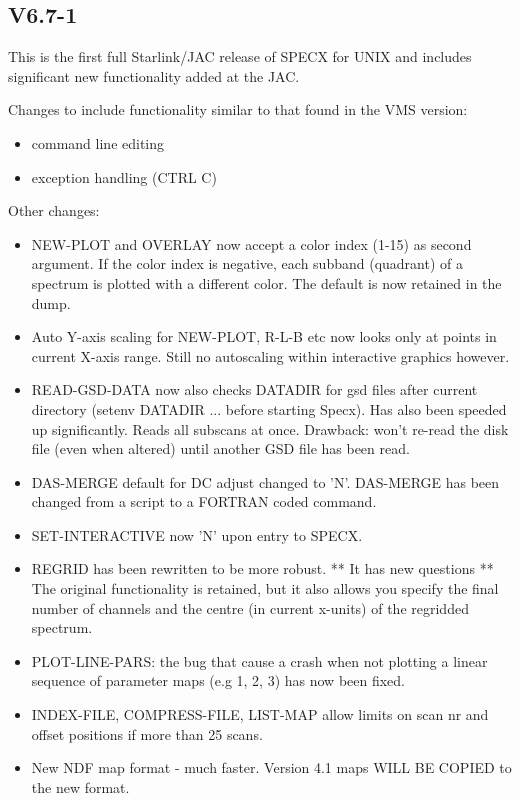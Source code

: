 \documentclass[twoside,11pt]{article}
\renewcommand{\_}{\texttt{\symbol{95}}}
\begin{document}
\subsection{V6.7-1}

This is the first full Starlink/JAC release of SPECX for UNIX and includes
significant new functionality added at the JAC.

Changes to include functionality similar to that found in the VMS version:
\begin{itemize}
\item command line editing
\item exception handling (CTRL C)
\end{itemize}

Other changes:
\begin{itemize}
\item NEW-PLOT and OVERLAY now accept a color index (1-15) as second
        argument. If the color index is negative, each subband (quadrant)
        of a spectrum is plotted with a different color. The default
        is now retained in the dump.

\item Auto Y-axis scaling for NEW-PLOT, R-L-B etc now looks only at points
        in current X-axis range. Still no autoscaling within interactive
        graphics however.

\item READ-GSD-DATA now also checks DATADIR for gsd files after current
        directory (setenv DATADIR ... before starting Specx). Has also
        been speeded up significantly. Reads all subscans at once. 
        Drawback: won't re-read the disk file (even when altered) until 
        another GSD file has been read.
\item DAS-MERGE default for DC adjust changed to 'N'. DAS-MERGE has been 
        changed from a script to a FORTRAN coded command.

\item SET-INTERACTIVE now 'N' upon entry to SPECX.

\item REGRID has been rewritten to be more robust. ** It has new questions **
        The original functionality is retained, but it also allows you specify
        the final number of channels and the centre (in current x-units) of
        the regridded spectrum.

\item PLOT-LINE-PARS: the bug that cause a crash when not plotting a linear
        sequence of parameter maps (e.g 1, 2, 3) has now been fixed.

\item INDEX-FILE, COMPRESS-FILE, LIST-MAP allow limits on scan nr and 
        offset positions if more than 25 scans.

\item New NDF map format - much faster. 
        Version 4.1 maps WILL BE COPIED to the new format. 

\end{itemize}
\end{document}
